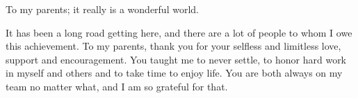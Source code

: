 \documentclass[12pt]{ucthesis}
\newcommand{\commentout}[1]{}
\begin{document}
\begin{frontmatter} %


\maketitle


\approvalpage


\copyrightpage


\begin{dedication}
\null\vfil {
\begin{center}

To my parents; it really is a wonderful world.


\end{center}}
\vfil\null
\end{dedication}


\begin{acknowledgements}


It has been a long road getting here, and there are a lot of people to whom I owe this achievement. To my parents, thank you for your selfless and limitless love, support and encouragement. You taught me to never settle, to honor hard work in myself and others and to take time to enjoy life. You are both always on my team no matter what, and I am so grateful for that.


\end{acknowledgements}
\end{frontmatter}
\end{document}
